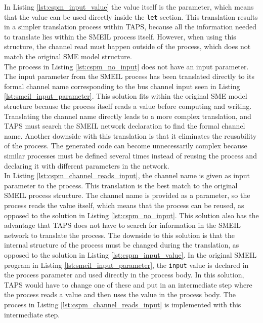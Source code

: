 In Listing \ref{lst:cspm_input_value} the value itself is the parameter, which means that the value can be used directly inside the \texttt{let} section.
This translation results in a simpler translation process within TAPS, because all the information needed to translate lies within the SMEIL process itself. However, when using this structure, the channel read must happen outside of the process, which does not match the original SME model structure. \\

The \cspm{} process in Listing \ref{lst:cspm_no_input} does not have an input parameter. The input parameter from the SMEIL process has been translated directly to its formal channel name corresponding to the bus channel input seen in Listing \ref{lst:smeil_input_parameter}. This solution fits within the original SME model structure because the process itself reads a value before computing and writing. Translating the channel name directly leads to a more complex translation, and TAPS must search the SMEIL network declaration to find the formal channel name. Another downside with this translation is that it eliminates the reusability of the process. The generated code can become unnecessarily complex because similar processes must be defined several times instead of reusing the process and declaring it with different parameters in the network.\\

In Listing \ref{lst:cspm_channel_reads_input}, the channel name is given as input parameter to the \cspm{} process. This translation is the best match to the original SMEIL process structure. The channel name is provided as a parameter, so the process reads the value itself, which means that the process can be reused, as opposed to the solution in Listing \ref{lst:cspm_no_input}. This solution also has the advantage that TAPS does not have to search for information in the SMEIL network to translate the process.
The downside to this solution is that the internal structure of the process must be changed during the translation, as opposed to the solution in Listing \ref{lst:cspm_input_value}. In the original SMEIL program in Listing \ref{lst:smeil_input_parameter}, the \texttt{input} value is declared in the process parameter and used directly in the process body. In this solution, TAPS would have to change one of these and put in an intermediate step where the process reads a value and then uses the value in the process body. The process in Listing \ref{lst:cspm_channel_reads_input} is implemented with this intermediate step.\\

